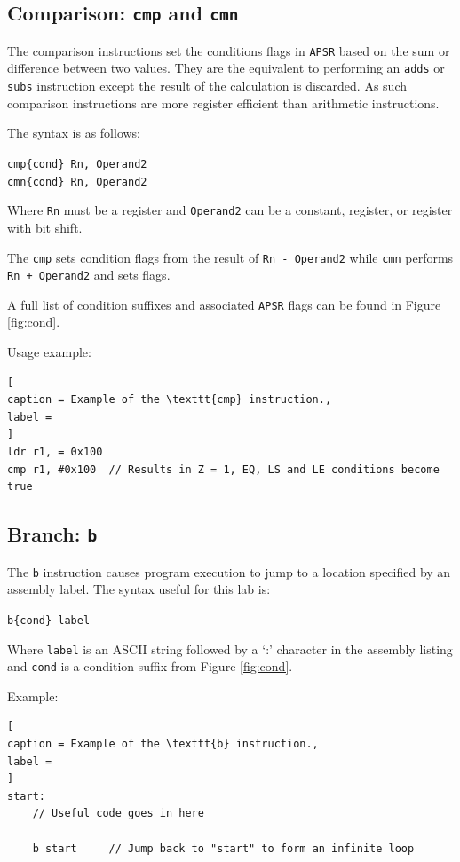 \documentclass{UoNMCHA}
\numberwithin{equation}{section}
\begin{document}
\subsection{Comparison: \texttt{cmp} and \texttt{cmn}}

The comparison instructions set the conditions flags in \texttt{APSR} based on the sum or difference between two values. They are the equivalent to performing an \texttt{adds} or \texttt{subs} instruction except the result of the calculation is discarded. As such comparison instructions are more register efficient than arithmetic instructions.

The syntax is as follows:

\texttt{cmp\{cond\} Rn, Operand2 \\ cmn\{cond\} Rn, Operand2}

Where \texttt{Rn} must be a register and \texttt{Operand2} can be a constant, register, or register with bit shift.

The \texttt{cmp} sets condition flags from the result of \texttt{Rn - Operand2} while \texttt{cmn} performs \texttt{Rn + Operand2} and sets flags.

A full list of condition suffixes and associated \texttt{APSR} flags can be found in Figure \ref{fig:cond}.

Usage example:

\begin{lstlisting}[
caption = Example of the \texttt{cmp} instruction.,
label = 
]
ldr r1, = 0x100
cmp r1, #0x100  // Results in Z = 1, EQ, LS and LE conditions become true
\end{lstlisting}

\subsection{Branch: \texttt{b}}

The \texttt{b} instruction causes program execution to jump to a location specified by an assembly label. The syntax useful for this lab is:

\texttt{b\{cond\} label}

Where \texttt{label} is an ASCII string followed by a `:' character in the assembly listing and \texttt{cond} is a condition suffix from Figure \ref{fig:cond}.

Example:

\begin{lstlisting}[
caption = Example of the \texttt{b} instruction.,
label = 
]
start:
    // Useful code goes in here

    b start     // Jump back to "start" to form an infinite loop
\end{lstlisting}
\end{document}
